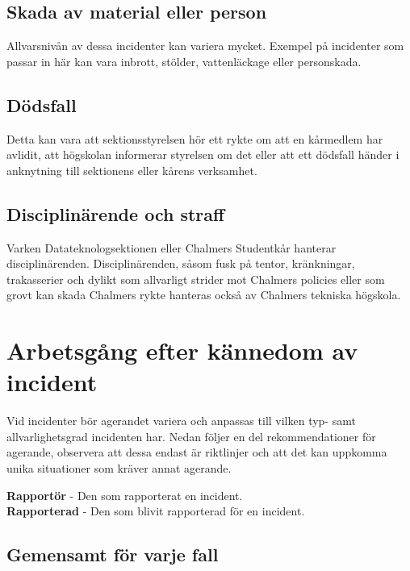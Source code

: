 \documentclass[a4paper]{dtek}
\begin{document}
\subsection{Skada av material eller person}
Allvarsnivån av dessa incidenter kan variera mycket. Exempel på incidenter som passar in här kan vara inbrott, stölder, vattenläckage eller personskada.

\subsection{Dödsfall}
Detta kan vara att sektionsstyrelsen hör ett rykte om att en kårmedlem har avlidit, att högskolan informerar styrelsen om det eller att ett dödsfall händer i anknytning till sektionens eller kårens verksamhet.

\subsection{Disciplinärende och straff}
Varken Datateknologsektionen eller Chalmers Studentkår hanterar
disciplinärenden. Disciplinärenden, såsom fusk på tentor, kränkningar, trakasserier och dylikt som allvarligt strider mot Chalmers policies eller som
grovt kan skada Chalmers rykte hanteras också av Chalmers tekniska högskola.

\section{Arbetsgång efter kännedom av incident}
Vid incidenter bör agerandet variera och anpassas till vilken typ- samt allvarlighetsgrad incidenten har. Nedan följer en del rekommendationer för agerande, observera att dessa endast är riktlinjer och att det kan uppkomma unika situationer som kräver annat agerande. 

\textbf{Rapportör} - Den som rapporterat en incident. \\
\textbf{Rapporterad} - Den som blivit rapporterad för en incident. 

\subsection{Gemensamt för varje fall}
\end{document}
